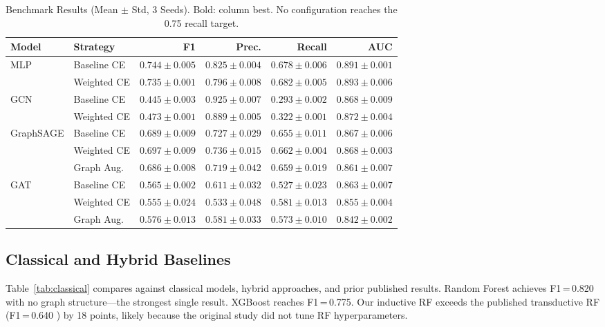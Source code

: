 \documentclass[journal,10pt,twoside]{IEEEtran}
\begin{document}
\begin{table}[!t]
\centering
\caption{Benchmark Results (Mean $\pm$ Std, 3 Seeds). Bold: column
  best. No configuration reaches the 0.75 recall target.}
\label{tab:main_results}
\small
\setlength{\tabcolsep}{5pt}
\begin{tabular}{llrrrr}
\toprule
\textbf{Model} & \textbf{Strategy}
  & \textbf{F1} & \textbf{Prec.}
  & \textbf{Recall} & \textbf{AUC} \\
\midrule
\multirow{2}{*}{MLP}
  & Baseline CE
    & $\mathbf{0.744\pm0.005}$ & $\mathbf{0.825\pm0.004}$
    & $0.678\pm0.006$ & $0.891\pm0.001$ \\
  & Weighted CE
    & $0.735\pm0.001$ & $0.796\pm0.008$
    & $0.682\pm0.005$ & $\mathbf{0.893\pm0.006}$ \\
\midrule
\multirow{2}{*}{GCN}
  & Baseline CE
    & $0.445\pm0.003$ & $0.925\pm0.007$
    & $0.293\pm0.002$ & $0.868\pm0.009$ \\
  & Weighted CE
    & $0.473\pm0.001$ & $0.889\pm0.005$
    & $0.322\pm0.001$ & $0.872\pm0.004$ \\
\midrule
\multirow{3}{*}{GraphSAGE}
  & Baseline CE
    & $0.689\pm0.009$ & $0.727\pm0.029$
    & $0.655\pm0.011$ & $0.867\pm0.006$ \\
  & Weighted CE
    & $0.697\pm0.009$ & $0.736\pm0.015$
    & $0.662\pm0.004$ & $0.868\pm0.003$ \\
  & Graph Aug.
    & $0.686\pm0.008$ & $0.719\pm0.042$
    & $0.659\pm0.019$ & $0.861\pm0.007$ \\
\midrule
\multirow{3}{*}{GAT}
  & Baseline CE
    & $0.565\pm0.002$ & $0.611\pm0.032$
    & $0.527\pm0.023$ & $0.863\pm0.007$ \\
  & Weighted CE
    & $0.555\pm0.024$ & $0.533\pm0.048$
    & $\mathbf{0.581\pm0.013}$ & $0.855\pm0.004$ \\
  & Graph Aug.
    & $0.576\pm0.013$ & $0.581\pm0.033$
    & $0.573\pm0.010$ & $0.842\pm0.002$ \\
\bottomrule
\end{tabular}
\end{table}

\subsection{Classical and Hybrid Baselines}

Table~\ref{tab:classical} compares against classical models, hybrid
approaches, and prior published results. Random Forest achieves
F1\,=\,0.820 with no graph structure---the strongest single result.
XGBoost reaches F1\,=\,0.775. Our inductive RF exceeds the published
transductive RF (F1\,=\,0.640 \cite{weber2019}) by 18 points, likely
because the original study did not tune RF hyperparameters.
\end{document}
